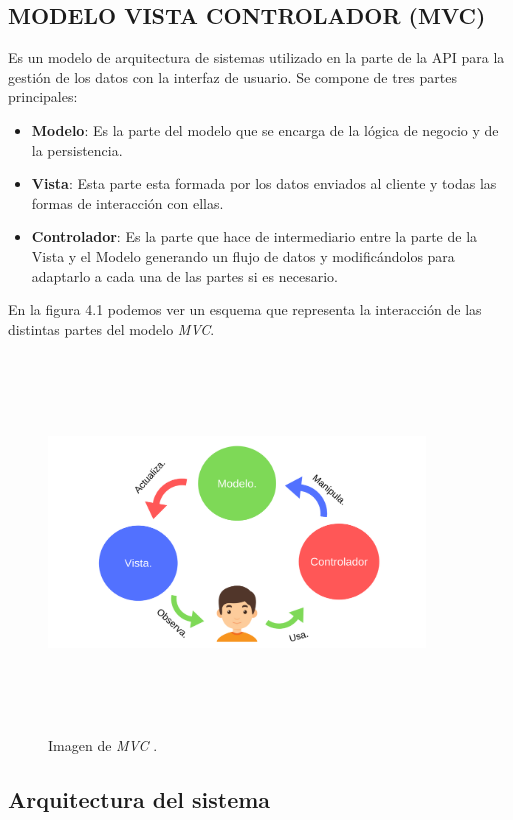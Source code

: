 \subsection{MODELO VISTA CONTROLADOR (MVC)}
Es un modelo de arquitectura de sistemas utilizado en la parte de la API para la gestión de los datos con la interfaz de usuario.
Se compone de tres partes principales:

\begin{itemize}
    \item \textbf{Modelo}: Es la parte del modelo que se encarga de la lógica de negocio y de la persistencia.
    \item \textbf{Vista}: Esta parte esta formada por los datos enviados al cliente y todas las formas de interacción con ellas.
    \item \textbf{Controlador}: Es la parte que hace de intermediario entre la parte de la Vista y el Modelo generando un flujo de datos y modificándolos para adaptarlo a cada una de las partes si es necesario.
\end{itemize}

En la figura 4.1 podemos ver un esquema que representa la interacción de las distintas partes del modelo \textit{MVC}.
\begin{figure}[t]
    \centering
    \includegraphics[width=10cm,height=10cm,keepaspectratio]{img/mvc.png}
    \caption{Imagen de \textit{MVC} \cite{mvcImag}.}
    \label{fig:imagen-mvc}
\end{figure}





\subsection{Arquitectura del sistema}

